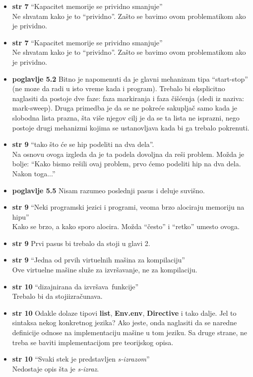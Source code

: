 \documentclass[a4paper]{report}
\begin{document}
\begin{itemize}
\item \textbf{str 7} ``Kapacitet memorije se prividno smanjuje'' \\ Ne shvatam kako je to ``prividno''. Zašto se bavimo ovom problematikom ako je prividno.
\item \textbf{str 7} ``Kapacitet memorije se prividno smanjuje'' \\ Ne shvatam kako je to ``prividno''. Zašto se bavimo ovom problematikom ako je prividno.
\item \textbf{poglavlje 5.2} Bitno je napomenuti da je glavni mehanizam tipa ``start-stop'' (ne moze da radi u isto vreme kada i program). Trebalo bi eksplicitno naglasiti da postoje dve faze: faza markiranja i faza čišćenja (sledi iz naziva: mark-sweep). Druga primedba je da se ne pokreće sakupljač samo kada je slobodna lista prazna, šta više njegov cilj je da se ta lista ne isprazni, nego postoje drugi mehanizmi kojima se ustanovljava kada bi ga trebalo pokrenuti.
\item \textbf{str 9} ``tako što će se hip podeliti na dva dela''. \\ Na osnovu ovoga izgleda da je ta podela dovoljna da reši problem. Možda je bolje: ``Kako bismo rešili ovaj problem, prvo ćemo podeliti hip na dva dela. Nakon toga...''
\item \textbf{poglavlje 5.5} Nisam razumeo poslednji pasus i deluje suvišno.
\item \textbf{str 9} ``Neki programski jezici i programi, veoma brzo alociraju memoriju na hipu'' \\ Kako se brzo, a kako sporo alocira. Možda ``često'' i ``retko'' umesto ovoga.
\item \textbf{str 9} Prvi pasus bi trebalo da stoji u glavi 2.
\item \textbf{str 9} ``Jedna od prvih virtuelnih mašina za kompilaciju'' \\ Ove virtuelne mašine služe za izvršavanje, ne za kompilaciju.
\item \textbf{str 10} ``dizajnirana da \color{blue}izvršava\color{black}~funkcije'' \\ Trebalo bi da stoji\color{blue}izračunava\color{black}.
\item \textbf{str 10} Odakle dolaze tipovi \textbf{list}, \textbf{Env.env}, \textbf{Directive} i tako dalje. Jel to sintaksa nekog konkretnog jezika? Ako jeste, onda naglasiti da se naredne definicije odnose na implementaciju mašine u tom jeziku. Sa druge strane, ne treba se baviti implementacijom pre teorijskog opisa.
\item \textbf{str 10} ``Svaki stek je predstavljen \textit{s-izrazom}'' \\ Nedostaje opis šta je \textit{s-izraz}.

\end{itemize}
\end{document}
